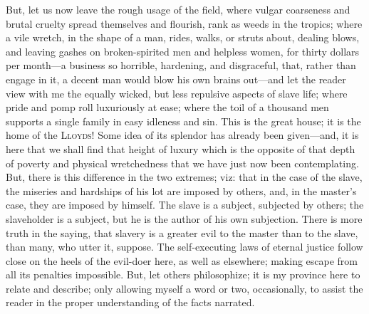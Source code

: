 But, let us now leave the rough usage of the field, where vulgar
coarseness and brutal cruelty spread themselves and flourish, rank as
weeds in the tropics; where a vile wretch, in the shape of a man, rides,
walks, or struts about, dealing blows, and leaving gashes on
broken-spirited men and helpless women, for thirty dollars per month---a
business so horrible, hardening, and disgraceful, that, rather than
engage in it, a decent man would blow his own brains out---and let the
reader view with me the equally wicked, but less repulsive aspects of
slave life; where pride and pomp roll luxuriously at ease; where the
toil of a thousand men supports a single family in easy idleness and
sin. This is the great house; it is the home of the \textsc{Lloyds}!
Some idea of its splendor has already been given---and, it is here that
we shall find that height of luxury which is the opposite of that depth
of poverty and physical wretchedness that we have just now been
contemplating. But, there is this difference in the two extremes; viz:
that in the case of the slave, the miseries and hardships of his lot are
imposed by others, and, in the master's case, they are imposed by
himself. The slave is a subject, subjected by others; the slaveholder is
a subject, but he is the author of his own subjection. There is more
truth in the saying, that slavery is a greater evil to the master than
to the slave, than many, who utter it, suppose. The self-executing laws
of eternal justice follow close on the heels of the evil-doer here, as
well as {}elsewhere; making escape from all its penalties impossible.
But, let others philosophize; it is my province here to relate and
describe; only allowing myself a word or two, occasionally, to assist
the reader in the proper understanding of the facts narrated.
